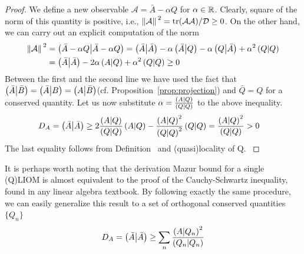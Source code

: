 \begin{proof}
  We define a new observable \(\mathcal{A} = \bar{A} - \alpha Q\) for \(\alpha \in \mathbb{R}\).
  Clearly, square of the norm of this quantity is positive, i.e., \(\norm*{\mathcal{A}}^2 = 
  \tr(\mathcal{A}\mathcal{A})/\mathcal{D} \geq 0\). On the other hand, we can carry out an
  explicit computation of the norm
  \begin{align*}
  \norm*{\mathcal{A}}^2 &= \left(\bar{A}-\alpha Q \middle| \bar{A}-\alpha Q\right) = \left(\bar{A} \middle| \bar{A}\right) - 
  \alpha \left(\bar{A} \middle| Q\right) - \alpha \left(Q \middle| \bar{A}\right) + \alpha^2 \left(Q \middle| Q\right) \\
  &= \left(\bar{A} \middle| \bar{A}\right) - 2\alpha \left(A \middle| Q\right) + \alpha^2 \left(Q \middle| Q\right) \geq 0
  \end{align*}
  Between the first and the second line we have used the fact that \(\left(\bar{A} \middle| \bar{B}\right) = 
  \left(\bar{A} \middle| B\right) = \left(A \middle| \bar{B}\right)\)(cf. Proposition~\ref{prop:projection}) and \(\bar{Q} = Q\) 
  for a conserved quantity. Let us now substitute \(\alpha = \frac{\left(A \middle| Q\right)}{\left(Q \middle| Q\right)}\) to the
  above inequality.
  \begin{align*}
    D_A = \left(\bar{A} \middle| \bar{A}\right) &\geq 2 \frac{\left(A \middle| Q\right)}{\left(Q \middle| Q\right)} \left(A \middle| Q\right) - \frac{\left(A \middle| Q\right)^2}{\left(Q \middle| Q\right)^2}\left(Q \middle| Q\right)
    = \frac{\left(A \middle| Q\right)^2}{\left(Q \middle| Q\right)} > 0
  \end{align*}
  The last equality follows from Definition~ and (quasi)locality of Q.
  \label{proof:single mazur}  
\end{proof}
It is perhaps worth noting that the derivation Mazur bound for a single (Q)LIOM is almost equivalent to the proof of
the Cauchy-Schwartz inequality, found in any linear algebra textbook. By following exactly the same procedure, 
we can easily generalize this result to a set of orthogonal conserved quantities \(\{Q_{n}\}\)
\begin{equation}
  D_A = \left(\bar{A} \middle| \bar{A}\right) \geq \sum_{n} \frac{\left(A \middle| Q_n\right)^2}{\left(Q_n \middle| Q_n\right)}
\end{equation}

